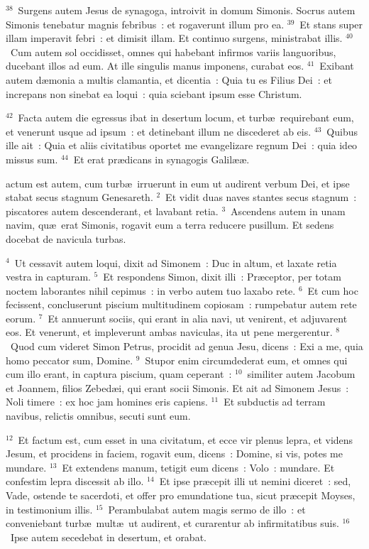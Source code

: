 ${}^{38}$~Surgens autem Jesus de synagoga, introivit in domum Simonis. Socrus autem Simonis tenebatur magnis febribus~: et rogaverunt illum pro ea.
${}^{39}$~Et stans super illam imperavit febri~: et dimisit illam. Et continuo surgens, ministrabat illis.
${}^{40}$~Cum autem sol occidisset, omnes qui habebant infirmos variis languoribus, ducebant illos ad eum. At ille singulis manus imponens, curabat eos.
${}^{41}$~Exibant autem d\ae monia a multis clamantia, et dicentia~: Quia tu es Filius Dei~: et increpans non sinebat ea loqui~: quia sciebant ipsum esse Christum.


${}^{42}$~Facta autem die egressus ibat in desertum locum, et turb\ae\ requirebant eum, et venerunt usque ad ipsum~: et detinebant illum ne discederet ab eis.
${}^{43}$~Quibus ille ait~: Quia et aliis civitatibus oportet me evangelizare regnum Dei~: quia ideo missus sum.
${}^{44}$~Et erat pr\ae dicans in synagogis Galil\ae \ae .

\bchapter
{}actum est autem, cum turb\ae\ irruerunt in eum ut audirent verbum Dei, et ipse stabat secus stagnum Genesareth.
${}^{2}$~Et vidit duas naves stantes secus stagnum~: piscatores autem descenderant, et lavabant retia.
${}^{3}$~Ascendens autem in unam navim, qu\ae\ erat Simonis, rogavit eum a terra reducere pusillum. Et sedens docebat de navicula turbas.


${}^{4}$~Ut cessavit autem loqui, dixit ad Simonem~: Duc in altum, et laxate retia vestra in capturam.
${}^{5}$~Et respondens Simon, dixit illi~: Pr\ae ceptor, per totam noctem laborantes nihil cepimus~: in verbo autem tuo laxabo rete.
${}^{6}$~Et cum hoc fecissent, concluserunt piscium multitudinem copiosam~: rumpebatur autem rete eorum.
${}^{7}$~Et annuerunt sociis, qui erant in alia navi, ut venirent, et adjuvarent eos. Et venerunt, et impleverunt ambas naviculas, ita ut pene mergerentur.
${}^{8}$~Quod cum videret Simon Petrus, procidit ad genua Jesu, dicens~: Exi a me, quia homo peccator sum, Domine.
${}^{9}$~Stupor enim circumdederat eum, et omnes qui cum illo erant, in captura piscium, quam ceperant~:
${}^{10}$~similiter autem Jacobum et Joannem, filios Zebed\ae i, qui erant socii Simonis. Et ait ad Simonem Jesus~: Noli timere~: ex hoc jam homines eris capiens.
${}^{11}$~Et subductis ad terram navibus, relictis omnibus, secuti sunt eum.


${}^{12}$~Et factum est, cum esset in una civitatum, et ecce vir plenus lepra, et videns Jesum, et procidens in faciem, rogavit eum, dicens~: Domine, si vis, potes me mundare.
${}^{13}$~Et extendens manum, tetigit eum dicens~: Volo~: mundare. Et confestim lepra discessit ab illo.
${}^{14}$~Et ipse pr\ae cepit illi ut nemini diceret~: sed, Vade, ostende te sacerdoti, et offer pro emundatione tua, sicut pr\ae cepit Moyses, in testimonium illis.
${}^{15}$~Perambulabat autem magis sermo de illo~: et conveniebant turb\ae\ mult\ae\ ut audirent, et curarentur ab infirmitatibus suis.
${}^{16}$~Ipse autem secedebat in desertum, et orabat.


